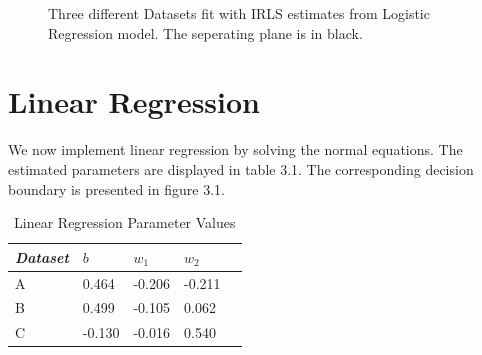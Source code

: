 \documentclass[paper=a4, fontsize=11pt]{scrartcl} %
\numberwithin{equation}{section} %
\numberwithin{figure}{section} %
\numberwithin{table}{section} %
\begin{document}
\begin{figure}
\begin{subfigure}{.5\textwidth}
		\end{subfigure}
		\caption{Three different Datasets fit with IRLS estimates from Logistic Regression model. The seperating plane is in black.}
	\end{figure}
	
	\section{Linear Regression}
	We now implement linear regression by solving the normal equations. The estimated parameters are displayed in table 3.1. The corresponding decision boundary is presented in figure 3.1.
	
	\begin{table}
		\caption {Linear Regression Parameter Values} \label{tab:title} 
		\begin{center}		
			\begin{tabular}{*5l}   
				\toprule
				\emph{Dataset}&  $b$ & $w_1$  & $w_2$\\\midrule
				A & 0.464 & -0.206 & -0.211 \\ 
				B & 0.499 & -0.105 & 0.062 \\
				C & -0.130 & -0.016 & 0.540 \\\bottomrule
				\hline
			\end{tabular}
		\end{center}
	\end{table}
\end{document}

